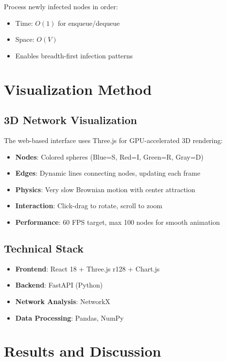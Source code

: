 \documentclass[12pt,a4paper]{article}
\begin{document}
Process newly infected nodes in order:
\begin{itemize}
    \item Time: $O(1)$ for enqueue/dequeue
    \item Space: $O(V)$
    \item Enables breadth-first infection patterns
\end{itemize}

\section{Visualization Method}

\subsection{3D Network Visualization}

The web-based interface uses Three.js for GPU-accelerated 3D rendering:
\begin{itemize}
    \item \textbf{Nodes}: Colored spheres (Blue=S, Red=I, Green=R, Gray=D)
    \item \textbf{Edges}: Dynamic lines connecting nodes, updating each frame
    \item \textbf{Physics}: Very slow Brownian motion with center attraction
    \item \textbf{Interaction}: Click-drag to rotate, scroll to zoom
    \item \textbf{Performance}: 60 FPS target, max 100 nodes for smooth animation
\end{itemize}

\subsection{Technical Stack}

\begin{itemize}
    \item \textbf{Frontend}: React 18 + Three.js r128 + Chart.js
    \item \textbf{Backend}: FastAPI (Python)
    \item \textbf{Network Analysis}: NetworkX
    \item \textbf{Data Processing}: Pandas, NumPy
\end{itemize}

\section{Results and Discussion}
\end{document}
